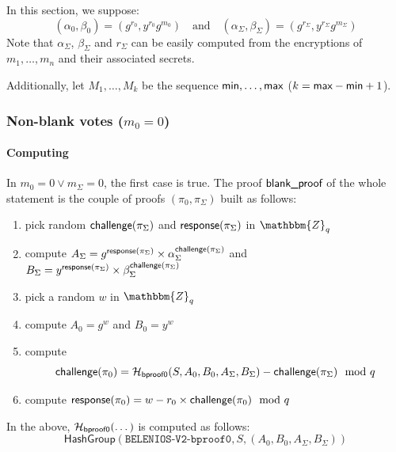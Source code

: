\documentclass[a4paper]{article}
\newcommand{\dstprefix}{BELENIOS-V2}
\newcommand{\Z}{\mathbbm{Z}}
\begin{document}
In this section, we suppose:
\[
(\alpha_0,\beta_0)=(g^{r_0},y^{r_0}g^{m_0})
\quad\text{and}\quad
(\alpha_\Sigma,\beta_\Sigma)=(g^{r_\Sigma},y^{r_\Sigma}g^{m_\Sigma})
\]
Note that $\alpha_\Sigma$, $\beta_\Sigma$ and $r_\Sigma$ can be easily
computed from the encryptions of $m_1,\dotsc,m_n$ and their associated
secrets.

Additionally, let $M_1,\dotsc,M_k$ be the sequence
$\textsf{min},\dots,\textsf{max}$ ($k=\textsf{max}-\textsf{min}+1$).

\subsubsection{Non-blank votes ($m_0=0$)}
\label{non-blank-votes}

\paragraph{Computing \bproof}
In $m_0=0\lor m_\Sigma=0$, the first case is true. The proof $\textsf{blank\_proof}$
of the whole statement is the couple of proofs $(\pi_0,\pi_\Sigma)$
built as follows:
\begin{enumerate}
\item pick random $\textsf{challenge}(\pi_\Sigma)$ and $\textsf{response}(\pi_\Sigma)$
  in $\Z_q$
\item compute
  $A_\Sigma=g^{\textsf{response}(\pi_\Sigma)}\times\alpha_\Sigma^{\textsf{challenge}(\pi_\Sigma)}$
  and
  $B_\Sigma=y^{\textsf{response}(\pi_\Sigma)}\times\beta_\Sigma^{\textsf{challenge}(\pi_\Sigma)}$
\item pick a random $w$ in $\Z_q$
\item compute $A_0=g^w$ and $B_0=y^w$
\item compute \[\textsf{challenge}(\pi_0)=\mathcal{H}_{\mathsf{bproof0}}(S,A_0,B_0,A_\Sigma,B_\Sigma)-\textsf{challenge}(\pi_\Sigma)\mod q\]
\item compute $\textsf{response}(\pi_0)=w-r_0\times\textsf{challenge}(\pi_0)\mod q$
\end{enumerate}
In the above, $\mathcal{H}_{\mathsf{bproof0}}(\dotsc)$ is computed as follows:
\[\textsf{HashGroup}(\texttt{\dstprefix-bproof0},S,(A_0,B_0,A_\Sigma,B_\Sigma))\]
\end{document}

